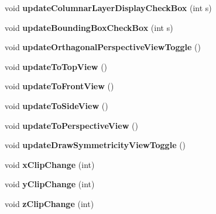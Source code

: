 \begin{DoxyCompactItemize}
\item 
\hypertarget{classMainWindow_a516111157b177a92fc5838a060f36908}{}void {\bfseries update\+Columnar\+Layer\+Display\+Check\+Box} (int s)\label{classMainWindow_a516111157b177a92fc5838a060f36908}

\item 
\hypertarget{classMainWindow_a52aa21a413bbc1f33a84f695b677f490}{}void {\bfseries update\+Bounding\+Box\+Check\+Box} (int s)\label{classMainWindow_a52aa21a413bbc1f33a84f695b677f490}

\item 
\hypertarget{classMainWindow_af2c325c24155eb2198ef705d78d452d8}{}void {\bfseries update\+Orthagonal\+Perspective\+View\+Toggle} ()\label{classMainWindow_af2c325c24155eb2198ef705d78d452d8}

\item 
\hypertarget{classMainWindow_a75a93ee195e391c9172bd77bb5eecd93}{}void {\bfseries update\+To\+Top\+View} ()\label{classMainWindow_a75a93ee195e391c9172bd77bb5eecd93}

\item 
\hypertarget{classMainWindow_a150680b802b4d7d5112209bd19cd3e5a}{}void {\bfseries update\+To\+Front\+View} ()\label{classMainWindow_a150680b802b4d7d5112209bd19cd3e5a}

\item 
\hypertarget{classMainWindow_a0a6e65fa32274c4a7fecb7ca04795388}{}void {\bfseries update\+To\+Side\+View} ()\label{classMainWindow_a0a6e65fa32274c4a7fecb7ca04795388}

\item 
\hypertarget{classMainWindow_a1607a9c35bde875a8218c763204e4fcf}{}void {\bfseries update\+To\+Perspective\+View} ()\label{classMainWindow_a1607a9c35bde875a8218c763204e4fcf}

\item 
\hypertarget{classMainWindow_a43031416fc2795d2b3cda8a158476549}{}void {\bfseries update\+Draw\+Symmetricity\+View\+Toggle} ()\label{classMainWindow_a43031416fc2795d2b3cda8a158476549}

\item 
\hypertarget{classMainWindow_ab677ef1bf70bc78faa5680576c14cd22}{}void {\bfseries x\+Clip\+Change} (int)\label{classMainWindow_ab677ef1bf70bc78faa5680576c14cd22}

\item 
\hypertarget{classMainWindow_a019023e11d09610ad8632baeb6854c61}{}void {\bfseries y\+Clip\+Change} (int)\label{classMainWindow_a019023e11d09610ad8632baeb6854c61}

\item 
\hypertarget{classMainWindow_af30a90f508a3d0b4434ddcaf848c69ac}{}void {\bfseries z\+Clip\+Change} (int)\label{classMainWindow_af30a90f508a3d0b4434ddcaf848c69ac}

\end{DoxyCompactItemize}
